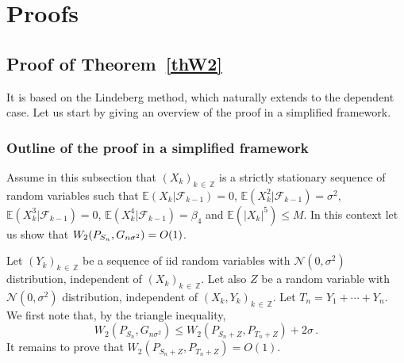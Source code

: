 \documentclass[10pt]{amsart}
\theoremstyle{definition}\newtheorem{defi}[theo]{Definition}\newtheorem{rema}[theo]{Remark}\newtheorem{exam}[theo]{Example}\newtheorem{exem}[theo]{Example}\newtheorem{nota}[theo]{Notation}
\newcommand{\bbE}{\mathbb{E}}
\newcommand{\bbZ}{\mathbb{Z}}
\newcommand{\clF}{\mathcal{F}}
\newcommand{\clN}{\mathcal{N}}
\begin{document}
\section{Proofs} \label{section4}


\subsection{Proof of Theorem~\ref{thW2}} \label{subproofTh}
It is based on the Lindeberg method, which naturally extends to the dependent case. Let us start by giving an overview of the proof in a simplified framework.

\subsubsection{Outline of the proof in a simplified framework}


Assume in this subsection that $(X_k)_{k\,\in\,\bbZ}$ is a strictly stationary sequence of random variables such that $\bbE (X_k | \clF_{k-1}) =0$, $\bbE (X^2_k | \clF_{k-1}) =\sigma^2$, $\bbE (X^3_k | \clF_{k-1}) =0$, $\bbE(X^4_k | \clF_{k-1}) =\beta_4$ and $\bbE (|X_k|^5) \leq M$. In this context let us show that $W_2 (P_{S_n}, G_{n \sigma^2})\linebreak = O (1)$.

Let $(Y_k)_{k\,\in\,\bbZ}$ be a sequence of iid random variables with $\clN (0, \sigma^2)$ distribution, independent of $(X_k)_{k\,\in\,\bbZ}$. Let also $Z$ be a random variable with $\clN (0,\sigma^2)$ distribution, independent of $(X_k,Y_k)_{k\,\in\,\bbZ}$. Let $T_n=Y_1 + \cdots +Y_n$. We first note that, by the triangle inequality,
\[
W_2  \left(P_{S_n}, G_{n \sigma^2}\right)\leq W_2 \left(P_{S_n+Z}, P_{T_n+Z}\right) + 2 \sigma \,.
\]
It remains to prove that $W_2 (P_{S_n+Z}, P_{T_n+Z})= O (1)$.
\end{document}
